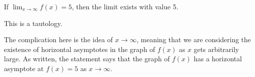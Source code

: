 \documentclass{ximera}
\author{Emma Smith Zbarsky}
\begin{document}
\begin{exercise}

If $\displaystyle \lim_{x\to \infty} f(x) = 5$, then the limit exists
with value 5.


\begin{hint}
This is a tautology.
\end{hint}


\begin{hint}
The complication here is the idea of $x\to \infty$, meaning that we are
considering the existence of horizontal asymptotes in the graph of
$f(x)$ as $x$ gets arbitrarily large. As written, the statement says
that the graph of $f(x)$ has a horizontal asymptote at $f(x)=5$ as
$x \to \infty$.
\end{hint}


\begin{multipleChoice}
\end{multipleChoice}

\end{exercise}
\end{document}
